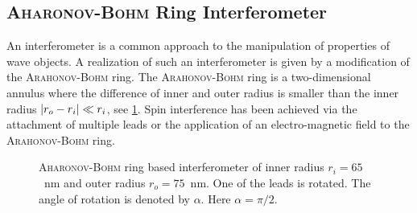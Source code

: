 \subsection{\textsc{Aharonov-Bohm} Ring Interferometer}
An interferometer is a common approach to the manipulation of properties of wave objects. A realization of such an interferometer is given by a modification of the \textsc{Arahonov-Bohm} ring. The \textsc{Arahonov-Bohm} ring is a two-dimensional annulus where the difference of inner and outer radius is smaller than the inner radius $\lvert r_o- r_i\rvert \ll r_i$, see \cref{fig:aharonovbohmring}.
Spin interference has been achieved via the attachment of multiple leads \cite{PhysRevB.75.035304} or the application of an electro-magnetic field \cite{PhysRevB.69.155335} to the \textsc{Arahonov-Bohm} ring.\par
\begin{figure}[!h]
  \centering
  \caption{\textsc{Aharonov-Bohm} ring based interferometer of inner radius $r_i=65$~nm and outer radius $r_o=75$~nm. One of the leads is rotated. The angle of rotation is denoted by $\alpha$. Here $\alpha=\pi/2$.}\label{fig:aharonovbohmring}
\end{figure}
